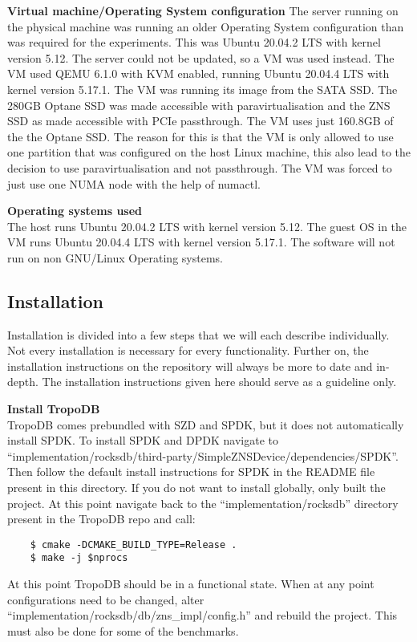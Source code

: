 \textbf{Virtual machine/Operating System configuration}
The server running on the physical machine was running an older Operating System configuration than was required for the experiments. This was Ubuntu 20.04.2 LTS with kernel version 5.12. The server could not be updated, so a VM was used instead. The VM used QEMU 6.1.0 with KVM enabled, running Ubuntu 20.04.4 LTS with kernel version 5.17.1. The VM was running its image from the SATA SSD. The 280GB Optane SSD was made accessible with paravirtualisation and the ZNS SSD as made accessible with PCIe passthrough. The VM uses just 160.8GB of the the Optane SSD. The reason for this is that the VM is only allowed to use one partition that was configured on the host Linux machine, this also lead to the decision to use paravirtualisation and not passthrough. The VM was forced to just use one NUMA node with the help of numactl.

\textbf{Operating systems used}\\
The host runs Ubuntu 20.04.2 LTS with kernel version 5.12.
The guest OS in the VM runs Ubuntu 20.04.4 LTS with kernel version 5.17.1. The software will not run on non GNU/Linux Operating systems.

\subsection{Installation}
Installation is divided into a few steps that we will each describe individually.
Not every installation is necessary for every functionality. Further on, the installation instructions on the repository will always be more to date and in-depth. The installation instructions given here should serve as a guideline only.

\textbf{Install TropoDB}\\
TropoDB comes prebundled with SZD and SPDK, but it does not automatically install SPDK.
To install SPDK and DPDK navigate to ``implementation/rocksdb/third-party/SimpleZNSDevice/dependencies/SPDK''. Then follow the default install instructions for SPDK in the README file present in this directory. If you do not want to install globally, only built the project.
At this point navigate back to the ``implementation/rocksdb'' directory present in the TropoDB repo and call:
\begin{verbatim}
    $ cmake -DCMAKE_BUILD_TYPE=Release .
    $ make -j $nprocs
\end{verbatim}
At this point TropoDB should be in a functional state. When at any point configurations need to be changed, alter ``implementation/rocksdb/db/zns\_impl/config.h'' and rebuild the project. This must also be done for some of the benchmarks.

